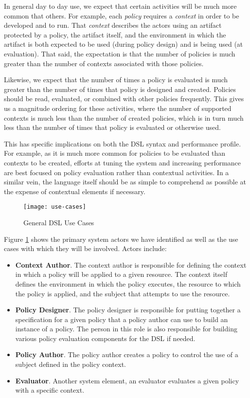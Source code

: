 In general day to day use, we expect that certain activities will be much more common that others.  For example, each \emph{policy} requires a \emph{context} in order to be developed and to run.  That \emph{context} describes the actors using an artifact protected by a policy, the artifact itself, and the environment in which the artifact is both expected to be used (during policy design) and is being used (at evaluation).  That said, the expectation is that the number of policies is much greater than the number of contexts associated with those policies.

Likewise, we expect that the number of times a policy is evaluated is much greater than the number of times that policy is designed and created.  Policies should be read, evaluated, or combined with other policies frequently.  This gives us a magnitude ordering for these activities, where the number of supported contexts is much less than the number of created policies, which is in turn much less than the number of times that policy is evaluated or otherwise used.

This has specific implications on both the DSL syntax and performance profile.  For example, as it is much more common for policies to be evaluated than contexts to be created, efforts at tuning the system and increasing performance are best focused on policy evaluation rather than contextual activities.  In a similar vein, the language itself should be as simple to comprehend as possible at the expense of contextual elements if necessary.

\begin{figure}[!t]
\centering
\texttt{[image: use-cases]}
\caption{General DSL Use Cases}
\label{fig:model:use-cases}
\end{figure}

Figure \ref{fig:model:use-cases} shows the primary system actors we have identified as well as the use cases with which they will be involved.  Actors include:
\begin{itemize}
\item \textbf{Context Author}.  The context author is responsible for defining the context in which a policy will be applied to a given resource.  The context itself defines the environment in which the policy executes, the resource to which the policy is applied, and the subject that attempts to use the resource.
\item \textbf{Policy Designer}.  The policy designer is responsible for putting together a specification for a given policy that a policy author can use to build an instance of a policy.  The person in this role is also responsible for building various policy evaluation components for the DSL if needed.  
\item \textbf{Policy Author}.  The policy author creates a policy to control the use of a subject defined in the policy context.
\item \textbf{Evaluator}. Another system element, an evaluator evaluates a given policy with a specific context.
\end{itemize}

